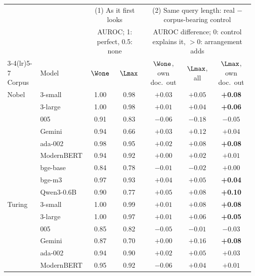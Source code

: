 \begin{table}[h]
\centering
\footnotesize
\setlength{\tabcolsep}{4pt}
\begin{tabular}{llccccc}
\toprule
 & & \multicolumn{2}{c}{(1) As it first looks} & \multicolumn{3}{c}{(2) Same query length: real $-$ corpus-bearing control} \\
 & & \multicolumn{2}{c}{\scriptsize AUROC; 1: perfect, 0.5: none} & \multicolumn{3}{c}{\scriptsize AUROC difference; 0: control explains it, $>0$: arrangement adds} \\
\cmidrule(lr){3-4}\cmidrule(lr){5-7}
Corpus & Model & $\Wone$ & $\Lmax$ & $\Wone$, own doc.\ out & $\Lmax$, all & $\Lmax$, own doc.\ out \\
\midrule
Nobel & 3-small & 1.00 & 0.98 & $+0.03$ & $+0.05$ & \textbf{+0.08}\rlap{\,\textcolor[HTML]{D55E00}{$\bullet$}} \\
 & 3-large & 1.00 & 0.98 & $+0.01$ & $+0.04$ & \textbf{+0.06}\rlap{\,\textcolor[HTML]{D55E00}{$\bullet$}} \\
 & 005 & 0.91 & 0.83 & $-0.06$ & $-0.18$ & $-0.05$ \\
 & Gemini & 0.94 & 0.66 & $+0.03$ & $+0.12$ & $+0.04$ \\
 & ada-002 & 0.98 & 0.95 & $+0.02$ & $+0.08$ & \textbf{+0.08}\rlap{\,\textcolor[HTML]{D55E00}{$\bullet$}} \\
 & ModernBERT & 0.94 & 0.92 & $+0.00$ & $+0.02$ & $+0.01$ \\
 & bge-base & 0.84 & 0.78 & $-0.01$ & $-0.02$ & $+0.00$ \\
 & bge-m3 & 0.97 & 0.93 & $+0.04$ & $+0.05$ & \textbf{+0.04}\rlap{\,\textcolor[HTML]{D55E00}{$\bullet$}} \\
 & Qwen3-0.6B & 0.90 & 0.77 & $+0.05$ & $+0.08$ & \textbf{+0.10}\rlap{\,\textcolor[HTML]{D55E00}{$\bullet$}} \\
\midrule
Turing & 3-small & 1.00 & 0.99 & $+0.01$ & $+0.08$ & \textbf{+0.08}\rlap{\,\textcolor[HTML]{D55E00}{$\bullet$}} \\
 & 3-large & 1.00 & 0.97 & $+0.01$ & $+0.06$ & \textbf{+0.05}\rlap{\,\textcolor[HTML]{D55E00}{$\bullet$}} \\
 & 005 & 0.85 & 0.82 & $-0.05$ & $-0.01$ & $-0.03$ \\
 & Gemini & 0.87 & 0.70 & $+0.00$ & $+0.16$ & \textbf{+0.08}\rlap{\,\textcolor[HTML]{D55E00}{$\bullet$}} \\
 & ada-002 & 0.94 & 0.90 & $+0.02$ & $+0.05$ & $+0.03$ \\
 & ModernBERT & 0.95 & 0.92 & $-0.06$ & $+0.04$ & $+0.01$ \\

\end{tabular}
\end{table}
